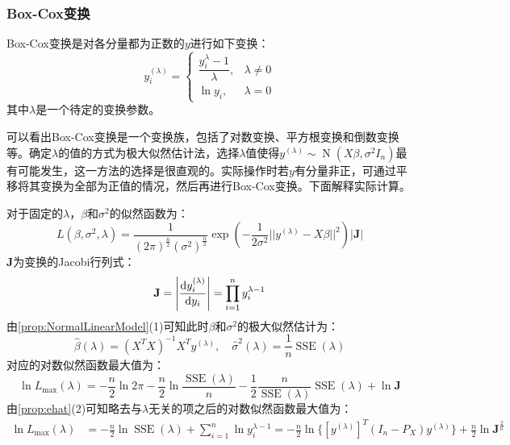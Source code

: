 \subsubsection{Box-Cox变换}
\begin{definition}
	Box-Cox变换是对各分量都为正数的$y$进行如下变换：
	\begin{equation*}
		y_i^{(\lambda)}=
		\begin{cases}
			\dfrac{y_i^{\lambda}-1}{\lambda},&\lambda\ne0 \\
			\ln y_i,&\lambda=0
		\end{cases}
	\end{equation*}
	其中$\lambda$是一个待定的变换参数。
\end{definition}
\begin{note}
	可以看出Box-Cox变换是一个变换族，包括了对数变换、平方根变换和倒数变换等。确定$\lambda$的值的方式为极大似然估计法，选择$\lambda$值使得$y^{(\lambda)}\sim\operatorname{N}(X\beta,\sigma^2I_n)$最有可能发生，这一方法的选择是很直观的。实际操作时若$y$有分量非正，可通过平移将其变换为全部为正值的情况，然后再进行Box-Cox变换。下面解释实际计算。\par
	对于固定的$\lambda$，$\beta$和$\sigma^2$的似然函数为：
	\begin{equation*}
		L(\beta,\sigma^2,\lambda)=\frac{1}{(2\pi)^{\frac{n}{2}}(\sigma^2)^\frac{n}{2}}\exp\left(-\frac{1}{2\sigma^2}||y^{(\lambda)}-X\beta||^2\right)|\mathbf{J}|
	\end{equation*}
	$\mathbf{J}$为变换的Jacobi行列式：
	\begin{equation*}
		\mathbf{J}=\left|\frac{\mathop{}\!\mathrm{d} y_i^{(\lambda)}}{\mathop{}\!\mathrm{d} y_i}\right|=\prod_{i=1}^{n}y_i^{\lambda-1}
	\end{equation*}
	由\cref{prop:NormalLinearModel}(1)可知此时$\beta$和$\sigma^2$的极大似然估计为：
	\begin{equation*}
		\hat{\beta}(\lambda)=(X^TX)^{-1}X^Ty^{(\lambda)},\quad\hat{\sigma}^2(\lambda)=\frac{1}{n}\operatorname{SSE}(\lambda)
	\end{equation*}
	对应的对数似然函数最大值为：
	\begin{equation*}
		\ln L_{\text{max}}(\lambda)=-\frac{n}{2}\ln2\pi-\frac{n}{2}\ln\frac{\operatorname{SSE}(\lambda)}{n}-\frac{1}{2}\frac{n}{\operatorname{SSE}(\lambda)}\operatorname{SSE}(\lambda)+\ln\mathbf{J}
	\end{equation*}
	由\cref{prop:ehat}(2)可知略去与$\lambda$无关的项之后的对数似然函数最大值为：
	\begin{align*}
		\ln L_{\text{max}}(\lambda)&=-\frac{n}{2}\ln \operatorname{SSE}(\lambda)+\sum_{i=1}^{n}\ln y_i^{\lambda-1}=-\frac{n}{2}\ln\{[y^{(\lambda)}]^T(I_n-P_X)y^{(\lambda)}\}+\frac{n}{2}\ln\mathbf{J}^{\frac{2}{n}} \\

\end{align*}
\end{note}
